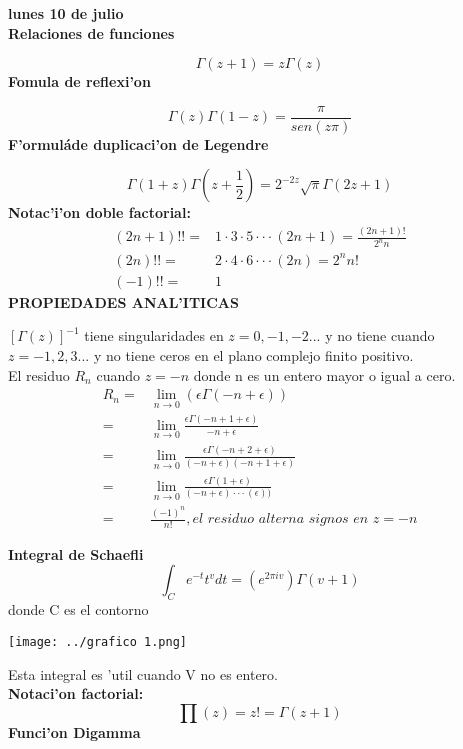 \documentclass{article}
\theoremstyle{definition}
\begin{document}
\textbf{lunes 10 de julio}\\
\textbf{Relaciones de funciones}

\[\Gamma (z+1) = z\Gamma (z)\]
\textbf{Fomula de reflexi'on}

\[\Gamma (z)\Gamma (1-z) = \frac{\pi}{sen(z\pi)}\]
\textbf{F'ormuláde duplicaci'on de Legendre}

\[\Gamma (1+z)\Gamma (z+\frac{1}{2}) = 2^{-2z}\sqrt{\pi}\Gamma (2z+1) \]
\textbf{Notac'i'on doble factorial: }
\[
\begin{array}{rl}
	(2n+1)!!=& 1\cdot 3\cdot 5\cdot\cdot\cdot (2n+1)=\frac{(2n+1)!}{2^nn}\\
	(2n)!!=& 2\cdot 4\cdot 6\cdot\cdot\cdot (2n)=2^nn!\\
	(-1)!!=& 1
\end{array}
\]
\textbf{PROPIEDADES ANAL'ITICAS}

$[\Gamma (z)]^{-1}$ tiene singularidades en $z=0,-1,-2...$ y no tiene cuando  $z=-1,2,3...$ y no tiene ceros en el plano complejo finito positivo.\\
El residuo $R_n$ cuando $z=-n$ donde n es un entero mayor o igual a cero.\\
\[
\begin{array}{rl}
	R_n=&\lim\limits_{n\to 0} (\epsilon\Gamma (-n+\epsilon))\\
	=& \lim\limits_{n\to 0} \frac{\epsilon\Gamma (-n+1+\epsilon)}{-n+\epsilon}\\
	=& \lim\limits_{n\to 0} \frac{\epsilon\Gamma (-n+2+\epsilon)}{(-n+\epsilon)(-n+1+\epsilon)}\\
	=&\lim\limits_{n\to 0} \frac{\epsilon\Gamma (1+\epsilon)}{(-n+\epsilon)\cdot\cdot\cdot(\epsilon))}\\
	=& \frac{(-1)^n}{n!}, \textit{el residuo alterna signos en } z=-n
\end{array}
\]

\textbf{Integral de Schaefli}
\[\int_Ce^{-t}t^vdt=(e^{2\pi iv})\Gamma (v+1)\]
donde C es el contorno
\begin{center}
\texttt{[image: ../grafico 1.png]} 
\end{center}

Esta integral es 'util cuando V no es entero.\\
\textbf{Notaci'on factorial:}
\[\prod (z)=z!=\Gamma (z+1)\]
\textbf{Funci'on Digamma}
\end{document}

